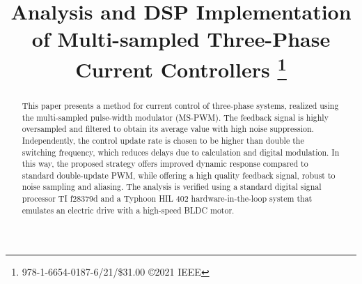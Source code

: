 \documentclass[conference]{IEEEtran}
\begin{document}
\title{Analysis and DSP Implementation of Multi-sampled Three-Phase Current Controllers
\thanks{978-1-6654-0187-6/21/\$31.00 ©2021 IEEE}
}

\author{
\and
{}
\and
{}
\and
{}
\and
{}
}


\maketitle

\begin{abstract}
This paper presents a method for current control of three-phase systems, realized using the multi-sampled pulse-width modulator (MS-PWM). The feedback signal is highly oversampled and filtered to obtain its average value with high noise suppression. Independently, the control update rate is chosen to be higher than double the switching frequency, which reduces delays due to calculation and digital modulation. In this way, the proposed strategy offers improved dynamic response compared to standard double-update PWM, while offering a high quality feedback signal, robust to noise sampling and aliasing.
The analysis is verified using a standard digital signal processor TI f28379d and a Typhoon HIL 402 hardware-in-the-loop system that emulates an electric drive with a high-speed BLDC motor.
\end{abstract}
\end{document}
